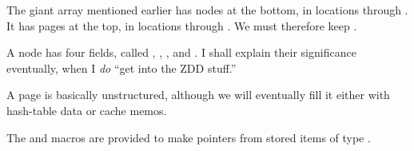 The giant  array mentioned earlier has nodes at the bottom,
in locations  through . It has pages at the
top,
in locations  through . We must
therefore keep
.

A node has four fields, called , , , and %
.
I shall explain their significance eventually,
when I {\it do\/} ``get into the ZDD stuff.''

A page is basically unstructured, although we will eventually fill
it either with hash-table data or cache memos.

The  and  macros are provided to make pointers
from stored items of type .

